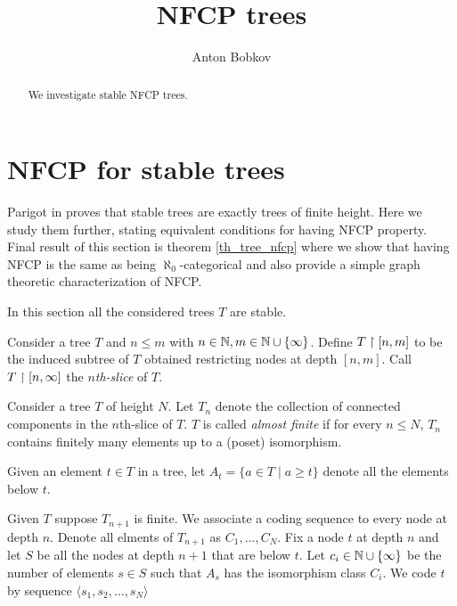 \documentclass{amsart}
\begin{document}
\title{NFCP trees}
\author{Anton Bobkov}

\begin{abstract}
	We investigate stable NFCP trees. 
\end{abstract}

\maketitle

\section{NFCP for stable trees}
Parigot in \cite{parigot_trees} proves that stable trees are exactly trees of finite height. Here we study them further, stating equivalent conditions for having NFCP property. Final result of this section is theorem \ref{th_tree_nfcp} where we show that having NFCP is the same as being $\aleph_0$-categorical and also provide a simple graph theoretic characterization of NFCP.

In this section all the considered trees $T$ are stable.

\begin{Definition}
Consider a tree $T$ and $n \leq m$ with $n \in \mathbb{N}, m \in \mathbb{N} \cup \{\infty\}$. Define $T \upharpoonright [n,m]$ to be the induced subtree of $T$ obtained restricting nodes at depth $[n,m]$. Call $T \upharpoonright [n, \infty]$ the \emph{$n$th-slice} of $T$.
\end{Definition}

\begin{Definition}
	Consider a tree $T$ of height $N$. Let $T_n$ denote the collection of connected components in the $n$th-slice of $T$. $T$ is called \emph{almost finite} if for every $n \leq N$, $T_n$ contains finitely many elements up to a (poset) isomorphism.
\end{Definition}

\begin{Definition}
	Given an element $t \in T$ in a tree, let $A_t = \{a \in T \mid a \geq t\}$ denote all the elements below $t$.
\end{Definition}

Given $T$ suppose $T_{n+1}$ is finite. We associate a coding sequence to every node at depth $n$.
Denote all elments of $T_{n+1}$ as $C_1, \ldots, C_N$.
Fix a node $t$ at depth $n$ and let $S$ be all the nodes at depth $n+1$ that are below $t$.
Let $c_i \in \mathbb{N} \cup \{\infty\}$ be the number of elements $s \in S$ such that $A_s$ has the isomorphism class $C_i$.
We code $t$ by sequence $\langle s_1, s_2, \ldots, s_N \rangle$
\end{document}
